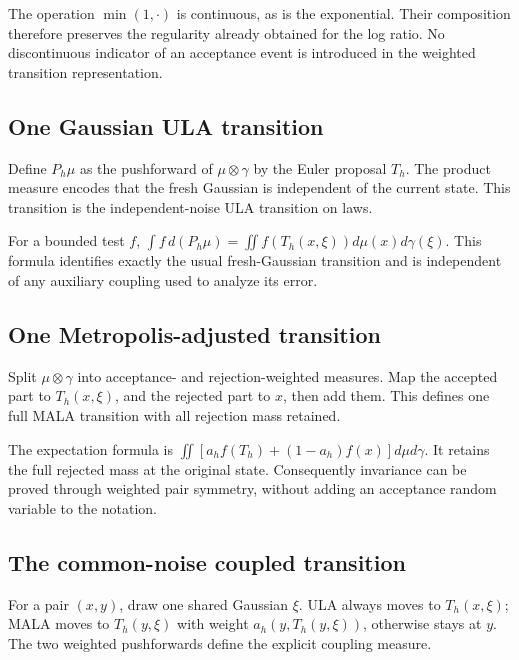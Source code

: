 \documentclass[11pt,a4paper]{article}
\begin{document}
The operation \(\min(1,\cdot)\) is continuous, as is the exponential. Their composition therefore preserves the regularity already obtained for the log ratio. No discontinuous indicator of an acceptance event is introduced in the weighted transition representation.


\subsection{\texorpdfstring{One Gaussian ULA transition}{One Gaussian ULA transition}}


Define \(P_h\mu\) as the pushforward of \(\mu\otimes\gamma\) by the Euler proposal \(T_h\). The product measure encodes that the fresh Gaussian is independent of the current state. This transition is the independent-noise ULA transition on laws.



For a bounded test \(f\), \(\int f\,d(P_h\mu)=\iint f(T_h(x,\xi))d\mu(x)d\gamma(\xi)\). This formula identifies exactly the usual fresh-Gaussian transition and is independent of any auxiliary coupling used to analyze its error.


\subsection{\texorpdfstring{One Metropolis-adjusted transition}{One Metropolis-adjusted transition}}


Split \(\mu\otimes\gamma\) into acceptance- and rejection-weighted measures. Map the accepted part to \(T_h(x,\xi)\), and the rejected part to \(x\), then add them. This defines one full MALA transition with all rejection mass retained.



The expectation formula is \(\iint[a_h f(T_h)+(1-a_h)f(x)]d\mu d\gamma\). It retains the full rejected mass at the original state. Consequently invariance can be proved through weighted pair symmetry, without adding an acceptance random variable to the notation.


\subsection{\texorpdfstring{The common-noise coupled transition}{The common-noise coupled transition}}


For a pair \((x,y)\), draw one shared Gaussian \(\xi\). ULA always moves to \(T_h(x,\xi)\); MALA moves to \(T_h(y,\xi)\) with weight \(a_h(y,T_h(y,\xi))\), otherwise stays at \(y\). The two weighted pushforwards define the explicit coupling measure.
\end{document}
